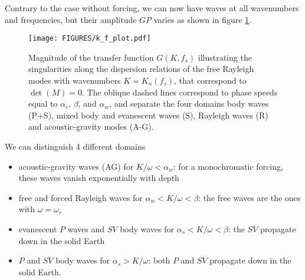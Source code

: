 Contrary to the case without forcing, we can now have waves at all wavenumbers and frequencies, but their amplitude $G P$ varies 
as shown in figure \ref{fig:k_f_plot}. 
\begin{figure}[htb]
\centerline{\texttt{[image: FIGURES/k\_f\_plot.pdf]}}
  \caption{Magnitude of the transfer function $G(K,f_s)$ illustrating the 
singularities along the dispersion relations of the free Rayleigh modes with wavenumbers $K=K_{n}(f_s)$, 
that correspond to $\det(M)=0$. The oblique 
dashed lines correspond to phase speeds equal to $\alpha_c$, $\beta$, and $\alpha_w$, and separate the four domains 
body waves (P+S), mixed body and evanescent waves (S), Rayleigh waves (R) and acoustic-gravity modes (A-G).
}
\label{fig:k_f_plot}
\end{figure}
We can distinguish 4 different domains 
\begin{itemize}
  \item acoustic-gravity waves (AG) for $K/\omega < \alpha_w$: for a monochromatic forcing, these waves vanish exponentially with depth
  \item free and forced Rayleigh waves for  $\alpha_w < K/\omega < \beta$: the free waves are the ones with $\omega=\omega_r$
  \item evanescent $P$ waves and $SV$ body waves  for  $\alpha_s < K/\omega < \beta$: the $SV$ propagate down in the solid Earth 
  \item $P$ and $SV$ body waves for  $\alpha_s > K/\omega$: both $P$ and $SV$ propagate down in the solid Earth.
 \end{itemize}

